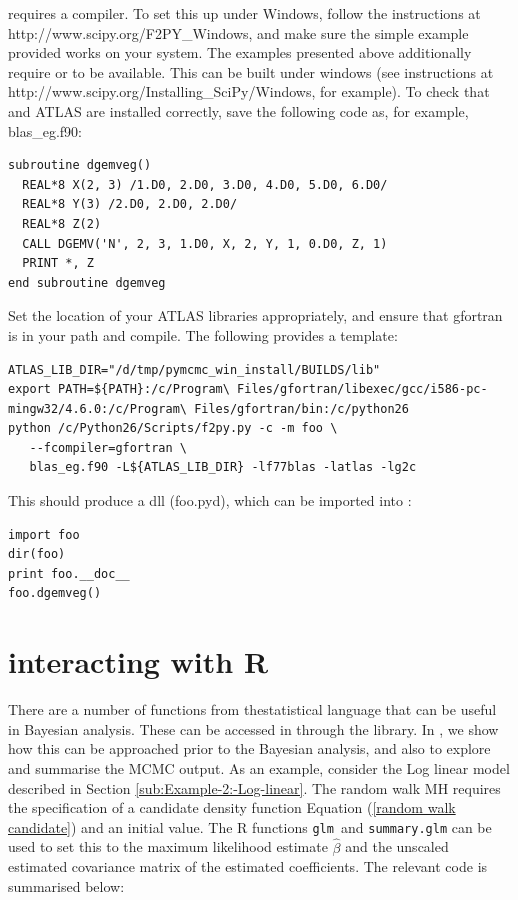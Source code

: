 \documentclass[article]{jss}
\begin{document}
 requires a  compiler. To set this up
under Windows, follow the instructions at
http://www.scipy.org/F2PY\_Windows, and make sure the simple example
provided works on your system. The examples presented above
additionally require  or  to be available. This
can be built under windows (see instructions at
http://www.scipy.org/Installing\_SciPy/Windows, for example). To check
that  and ATLAS are installed correctly, save the following
code as, for example, blas\_eg.f90:


\begin{lstlisting}[basicstyle={\scriptsize}]
subroutine dgemveg()
  REAL*8 X(2, 3) /1.D0, 2.D0, 3.D0, 4.D0, 5.D0, 6.D0/
  REAL*8 Y(3) /2.D0, 2.D0, 2.D0/
  REAL*8 Z(2)
  CALL DGEMV('N', 2, 3, 1.D0, X, 2, Y, 1, 0.D0, Z, 1)
  PRINT *, Z
end subroutine dgemveg
\end{lstlisting}


Set the location of your ATLAS libraries appropriately, and ensure
that gfortran is in your path and compile. The following provides a
template:


\begin{lstlisting}[basicstyle={\scriptsize}]
ATLAS_LIB_DIR="/d/tmp/pymcmc_win_install/BUILDS/lib"
export PATH=${PATH}:/c/Program\ Files/gfortran/libexec/gcc/i586-pc-mingw32/4.6.0:/c/Program\ Files/gfortran/bin:/c/python26 
python /c/Python26/Scripts/f2py.py -c -m foo \
   --fcompiler=gfortran \
   blas_eg.f90 -L${ATLAS_LIB_DIR} -lf77blas -latlas -lg2c 
\end{lstlisting}


This should produce a  dll (foo.pyd), which can be imported
into :


\begin{lstlisting}[basicstyle={\scriptsize}]
import foo
dir(foo) 
print foo.__doc__
foo.dgemveg() 
\end{lstlisting}

\section[PyMCMC interacting with R]{ interacting with R}
\label{sec:PyMCMC-interacting-with}

There are a number of functions from thestatistical
language \citet{R} that can be useful in Bayesian analysis. These can
be accessed in \pkg{PyMCMC} through the \pkg{RPy2} 
library. In \pkg{PyMCMC}, we show how this can be approached prior to
the Bayesian analysis, and also to explore and summarise the MCMC
output. As an example, consider the Log linear model described in
Section \ref{sub:Example-2:-Log-linear}. The random walk MH requires
the specification of a candidate density function Equation
(\ref{random walk candidate}) and an initial value. The R functions
\texttt{glm }and \texttt{summary.glm} can be used to set this to the
maximum likelihood estimate $\hat{\beta}$ and the unscaled estimated
covariance matrix of the estimated coefficients. The relevant code is
summarised below:
\end{document}
